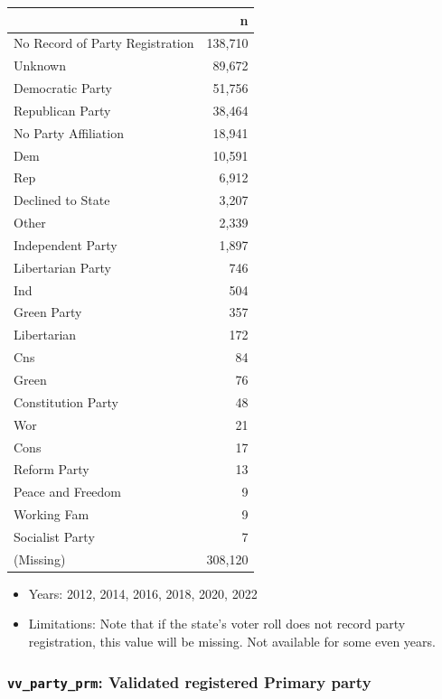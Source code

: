 \documentclass[10pt,article,oneside]{memoir}
\theoremstyle{definition}
\begin{document}
\begin{table}[H]
\centering
\begin{tabular}[t]{lr}
\toprule
 & n\\
\midrule
No Record of Party Registration & 138,710\\
Unknown & 89,672\\
Democratic Party & 51,756\\
Republican Party & 38,464\\
No Party Affiliation & 18,941\\
Dem & 10,591\\
Rep & 6,912\\
Declined to State & 3,207\\
Other & 2,339\\
Independent Party & 1,897\\
Libertarian Party & 746\\
Ind & 504\\
Green Party & 357\\
Libertarian & 172\\
Cns & 84\\
Green & 76\\
Constitution Party & 48\\
Wor & 21\\
Cons & 17\\
Reform Party & 13\\
Peace and Freedom & 9\\
Working Fam & 9\\
Socialist Party & 7\\
(Missing) & 308,120\\
\bottomrule
\end{tabular}
\end{table}

\begin{itemize}
\tightlist
\item
  Years: 2012, 2014, 2016, 2018, 2020, 2022
\item
  Limitations: Note that if the state's voter roll does not record party
  registration, this value will be missing. Not available for some even
  years.
\end{itemize}

\subsubsection{\texorpdfstring{\texttt{vv\_party\_prm}: Validated
registered Primary
party}{vv\_party\_prm: Validated registered Primary party}}\label{vv_party_prm-validated-registered-primary-party}
\end{document}
